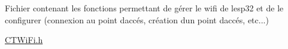 Fichier contenant les fonctions permettant de gérer le wifi de l\textquotesingle{}esp32 et de le configurer (connexion au point d\textquotesingle{}accés, création d\textquotesingle{}un point d\textquotesingle{}accés, etc...)

\mbox{\hyperlink{_c_t_wi_fi_8h}{CTWi\+Fi.\+h}} 